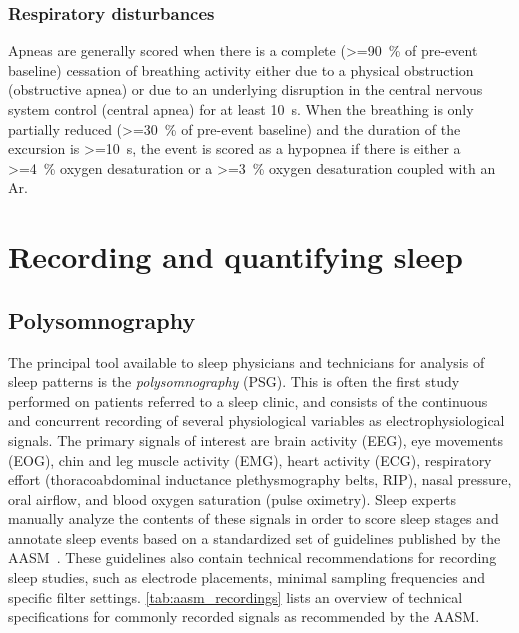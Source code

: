             \subsubsection{Respiratory disturbances}
            Apneas are generally scored when there is a complete (\SI{>=90}{\percent} of pre-event baseline) cessation of breathing activity either due to a physical obstruction (obstructive apnea) or due to an underlying disruption in the central nervous system control (central apnea) for at least \SI{10}{\second}.
            When the breathing is only partially reduced (\SI{>=30}{\percent} of pre-event baseline) and the duration of the excursion is \SI{>=10}{\second}, the event is scored as a hypopnea if there is either a \SI{>=4}{\percent} oxygen desaturation or a \SI{>=3}{\percent} oxygen desaturation coupled with an \ac{Ar}.
                
                
    \section{Recording and quantifying sleep}\label{sec:recording-quantifying-sleep}
    
        \subsection{Polysomnography}\label{sec:polysomnography}
            The principal tool available to sleep physicians and technicians for analysis of sleep patterns is the \textit{polysomnography} (\acs{PSG}).
            This is often the first study performed on patients referred to a sleep clinic, and consists of the continuous and concurrent recording of several physiological variables as electrophysiological signals.
            The primary signals of interest are brain activity (\ac{EEG}), eye movements (\ac{EOG}), chin and leg muscle activity (\ac{EMG}), heart activity (\ac{ECG}), respiratory effort (thoracoabdominal inductance plethysmography belts, RIP), nasal pressure, oral airflow, and blood oxygen saturation (pulse oximetry).
            Sleep experts manually analyze the contents of these signals in order to score sleep stages and annotate sleep events based on a standardized set of guidelines published by the \ac{AASM}~\cite{Berry2020}. 
            These guidelines also contain technical recommendations for recording sleep studies, such as electrode placements, minimal sampling frequencies and specific filter settings. \cref{tab:aasm_recordings} lists an overview of technical specifications for commonly recorded signals as recommended by the \ac{AASM}.
            
